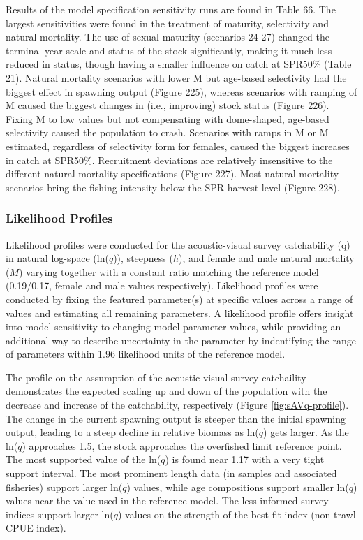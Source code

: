 \documentclass[11pt,
  english,
  letterpaper,
]{article}
\begin{document}
Results of the model specification sensitivity runs are found in Table 66. The largest sensitivities were found in the treatment of maturity, selectivity and natural mortality. The use of sexual maturity (scenarios 24-27) changed the terminal year scale and status of the stock significantly, making it much less reduced in status, though having a smaller influence on catch at SPR50\% (Table 21). Natural mortality scenarios with lower M but age-based selectivity had the biggest effect in spawning output (Figure 225), whereas scenarios with ramping of M caused the biggest changes in (i.e., improving) stock status (Figure 226). Fixing M to low values but not compensating with dome-shaped, age-based selectivity caused the population to crash. Scenarios with ramps in M or M estimated, regardless of selectivity form for females, caused the biggest increases in catch at SPR50\%. Recruitment deviations are relatively insensitive to the different natural mortality specifications (Figure 227). Most natural mortality scenarios bring the fishing intensity below the SPR harvest level (Figure 228).

\hypertarget{likelihood-profiles}{%
\subsubsection{Likelihood Profiles}\label{likelihood-profiles}}

Likelihood profiles were conducted for the acoustic-visual survey catchability (q) in natural log-space (ln(\(q\))), steepness (\(h\)), and female and male natural mortality (\(M\)) varying together with a constant ratio matching the reference model (0.19/0.17, female and male values respectively). Likelihood profiles were conducted by fixing the featured parameter(s) at specific values across a range of values and estimating all remaining parameters. A likelihood profile offers insight into model sensitivity to changing model parameter values, while providing an additional way to describe uncertainty in the parameter by indentifying the range of parameters within 1.96 likelihood units of the reference model.

The profile on the assumption of the acoustic-visual survey catchaility demonstrates the expected scaling up and down of the population with the decrease and increase of the catchability, respectively (Figure \ref{fig:sAVq-profile}). The change in the current spawning output is steeper than the initial spawning output, leading to a steep decline in relative biomass as ln(\(q\)) gets larger. As the ln(\(q\)) approaches 1.5, the stock approaches the overfished limit reference point. The most supported value of the ln(\(q\)) is found near 1.17 with a very tight support interval. The most prominent length data (in samples and associated fisheries) support larger ln(\(q\)) values, while age compositions support smaller ln(\(q\)) values near the value used in the reference model. The less informed survey indices support larger ln(\(q\)) values on the strength of the best fit index (non-trawl CPUE index).
\end{document}
